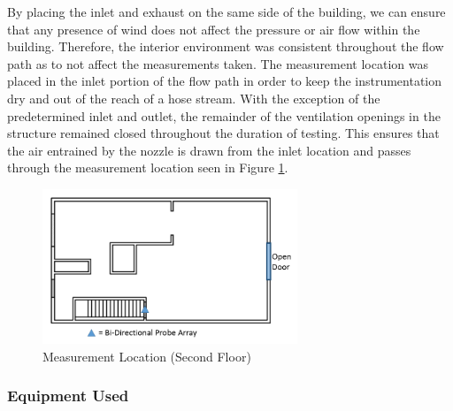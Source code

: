 \documentclass{article}
\begin{document}



By placing the inlet and exhaust on the same side of the building, we can ensure that any presence of wind does not affect the pressure or air flow within the building. Therefore, the interior environment was consistent throughout the flow path as to not affect the measurements taken. The measurement location was placed in the inlet portion of the flow path in order to keep the instrumentation dry and out of the reach of a hose stream. With the exception of the predetermined inlet and outlet, the remainder of the ventilation openings in the structure remained closed throughout the duration of testing. This ensures that the air entrained by the nozzle is drawn from the inlet location and passes through the measurement location seen in Figure \ref{fig:Measurement_Location_Second_Floor}.

\begin{figure}[!ht]
	\centering
	\includegraphics[width=3in]{Figures/Air_Entrainment/Measurement_Locations_Secondfloor}
	\caption{Measurement Location (Second Floor)}
	\label{fig:Measurement_Location_Second_Floor}
\end{figure}

\clearpage

\subsubsection{Equipment Used}
\end{document}
